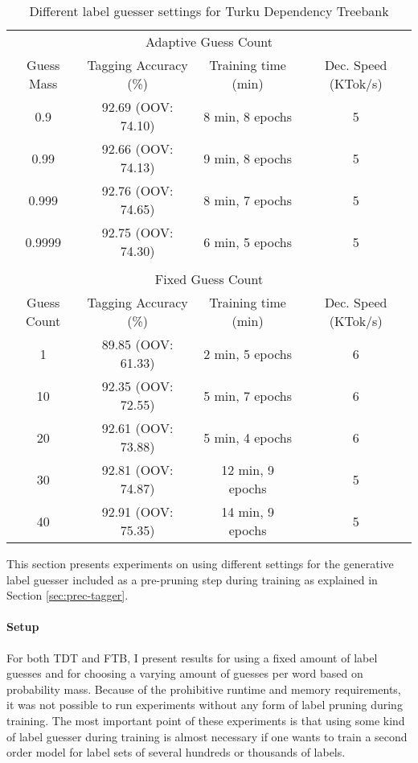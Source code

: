 \begin{table}[htb!]
\begin{center}
\begin{tabular}{cccc}
\multicolumn{4}{c}{Adaptive Guess Count}\\
Guess Mass & Tagging Accuracy (\%) & Training time (min) & Dec. Speed (KTok/s)\\
\hline
0.9        & 92.69 (OOV: 74.10)           & 8 min, 8 epochs           & 5            \\
0.99       & 92.66 (OOV: 74.13)           & 9 min, 8 epochs           & 5            \\
0.999      & 92.76 (OOV: 74.65)           & 8 min, 7 epochs            & 5            \\
0.9999      & 92.75 (OOV: 74.30)           & 6 min, 5 epochs            & 5            \\
           &                  &               &               \\
\multicolumn{4}{c}{Fixed Guess Count}\\
Guess Count & Tagging Accuracy (\%) & Training time (min) & Dec. Speed (KTok/s) \\
\hline
1        & 89.85  (OOV: 61.33)          & 2 min, 5 epochs            & 6            \\
10       & 92.35  (OOV: 72.55)          & 5 min, 7 epochs            & 6            \\
20       & 92.61  (OOV: 73.88)          & 5 min, 4 epochs            & 6            \\
30       & 92.81  (OOV: 74.87)          & 12 min, 9 epochs          & 5            \\
40       & 92.91  (OOV: 75.35)          & 14 min, 9 epochs            & 5            \\
\end{tabular}
\caption{Different label guesser settings for Turku Dependency Treebank}\label{tab:prune-res}
\end{center}
\end{table}

This section presents experiments on using different settings for the
generative label guesser included as a pre-pruning step during
training as explained in Section \ref{sec:prec-tagger}.

\paragraph{Setup}For both TDT and FTB, I present results for using a fixed amount of
label guesses and for choosing a varying amount of guesses per word
based on probability mass. Because of the prohibitive runtime and
memory requirements, it was not possible to run experiments without
any form of label pruning during training. The most important point of
these experiments is that using some kind of label guesser during
training is almost necessary if one wants to train a second order
model for label sets of several hundreds or thousands of labels.

